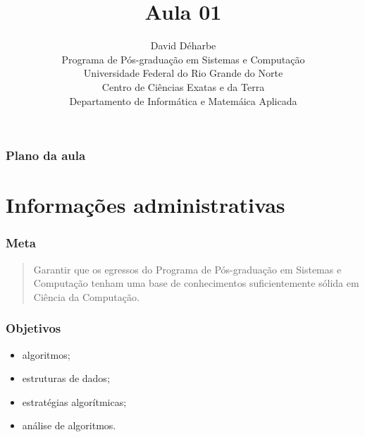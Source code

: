 \documentclass{beamer}
\title{Aula 01}
\author{David Déharbe \\
  Programa de Pós-graduação em Sistemas e Computação \\
  Universidade Federal do Rio Grande do Norte \\
  Centro de Ciências Exatas e da Terra \\
  Departamento de Informática e Matemáica Aplicada}
\date{}
\begin{document}
\begin{frame}
  \titlepage
\end{frame}

\begin{frame}
  \frametitle{Plano da aula}
  \tableofcontents
\end{frame}

\section{Informações administrativas}

\begin{frame}

  \frametitle{Meta}

  \begin{quote}
    Garantir que os egressos do Programa de Pós-graduação em Sistemas
    e Computação tenham uma base de conhecimentos suficientemente
    sólida em Ciência da Computação.
  \end{quote}

\end{frame}

\begin{frame}

  \frametitle{Objetivos}

  \begin{itemize}
    \item algoritmos;
    \item estruturas de dados;
    \item estratégias algorítmicas;
    \item análise de algoritmos.
  \end{itemize}
      
\end{frame}
\end{document}
